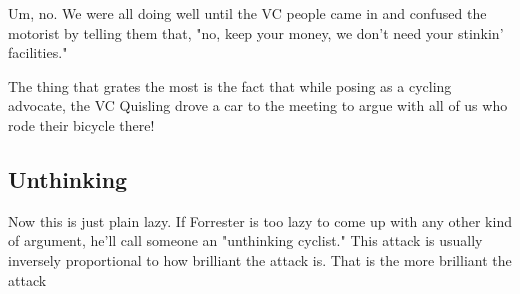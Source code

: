 Um, no. We were all doing well until the VC people came in and confused the motorist by telling them that, "no, keep your money, we don't need your stinkin' facilities."

The thing that grates the most is the fact that while posing as a cycling advocate, the VC Quisling drove a car to the meeting to argue with all of us who rode their bicycle there!

\subsection{Unthinking} 

Now this is just plain lazy. If Forrester is too lazy to come up with any other kind of argument, he'll call someone an "unthinking cyclist." This attack is usually inversely proportional to how brilliant the attack is. That is the more brilliant the attack

